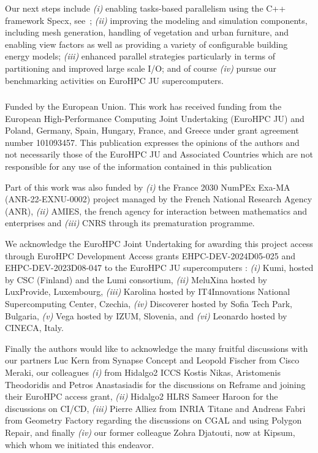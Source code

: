 \documentclass[runningheads]{llncs}
\begin{document}
Our next steps include \textit{(i)} enabling tasks-based parallelism using the C++ framework Specx, see~\cite{cardosi_specx_2022}; \textit{(ii)} improving the modeling and simulation components, including mesh generation, handling of vegetation and urban furniture, and enabling view factors as well as providing a variety of configurable building energy models; \textit{(iii)} enhanced parallel strategies particularly in terms of partitioning and improved large scale I/O; and of course \textit{(iv)} pursue our benchmarking activities on EuroHPC JU supercomputers.


\begin{credits}
\subsubsection{\ackname} Funded by the  European  Union. This work has received funding from the European High-Performance Computing Joint Undertaking (EuroHPC JU)  and  Poland, Germany,  Spain,  Hungary,  France, and Greece under grant agreement number 101093457. This  publication  expresses  the  opinions  of  the  authors  and  not  necessarily those of the EuroHPC JU and Associated Countries which are not responsible for any use of the information contained in this publication

Part of this work was also funded by \textit{(i)} the France 2030 NumPEx Exa-MA (ANR-22-EXNU-0002) project managed by the French National Research Agency (ANR), \textit{(ii)} AMIES, the french agency for interaction between mathematics and enterprises and \textit{(iii)} CNRS through its prematuration programme.

We acknowledge the EuroHPC Joint Undertaking for awarding this project access through  EuroHPC Development Access grants EHPC-DEV-2024D05-025 and EHPC-DEV-2023D08-047 to the EuroHPC JU supercomputers : \textit{(i)} Kumi, hosted by CSC (Finland) and the Lumi consortium, \textit{(ii)} MeluXina hosted by LuxProvide, Luxembourg, \textit{(iii)} Karolina hosted by IT4Innovations National Supercomputing Center, Czechia, \textit{(iv)} Discoverer hosted by Sofia Tech Park, Bulgaria, \textit{(v)} Vega hosted by IZUM, Slovenia, and \textit{(vi)} Leonardo hosted by CINECA, Italy.


Finally the authors would like to acknowledge the many fruitful discussions with our partners Luc Kern from Synapse Concept and Leopold Fischer from Cisco Meraki, our colleagues \textit{(i)} from Hidalgo2 ICCS Kostis Nikas, Aristomenis Theodoridis and Petros Anastasiadis for the discussions on Reframe and joining their EuroHPC access grant, \textit{(ii)} Hidalgo2 HLRS Sameer Haroon for the discussions on CI/CD, \textit{(iii)} Pierre Alliez from INRIA Titane and Andreas Fabri from Geometry Factory regarding the discussions on CGAL and using Polygon Repair, and finally \textit{(iv)} our former colleague Zohra Djatouti, now at Kipsum, which whom we initiated this endeavor. 


\end{credits}
\end{document}
